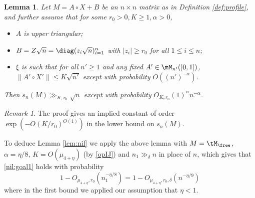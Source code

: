 \documentclass[aop,preprint]{imsart}
\theoremstyle{plain}
\newtheorem{lemma}[theorem]{Lemma}
\theoremstyle{definition}
\theoremstyle{remark}
\newtheorem{remark}[theorem]{Remark}
\numberwithin{equation}{section}
\numberwithin{theorem}{section}
\begin{document}
\begin{lemma}
Let $M= A\circ X + B$ be an $n\times n$ matrix as in Definition \ref{def:profile}, and further assume that for some $r_0>0, K\ge 1, \alpha>0$,
\begin{itemize}
\item $A$ is upper triangular;
\item $B=Z\sqrt{n} = \diag(z_i\sqrt{n})_{i=1}^n$ with $|z_i|\ge r_0$ for all $1\le i\le n$;
\item $\xi$ is such that for all $n'\ge 1$ and any fixed $A'\in \mM_{n'}([0,1])$, $\|A'\circ X'\|\le K\sqrt{n'}$  except with probability $O((n')^{-\alpha})$.
\end{itemize}
Then $s_n(M) \gg_{K,r_0}\sqrt{n}$ except with probability $O_{K,r_0}(1)^\alpha n^{-\alpha}$.
\end{lemma}

\begin{remark}
The proof gives an implied constant of order $\exp(-O(K/r_0)^{O(1)})$ in the lower bound on $s_n(M)$. 
\end{remark}

To deduce Lemma \ref{lem:nil} we apply the above lemma with $M=\tM_{\free}$, $\alpha=\eta/8$, $K=O(\mu_{4+\eta})$ (by \eqref{opIJ}) and $n_1\gg_{\delta}n$ in place of $n$, which gives that \eqref{nil:goal1} holds with probability 
\begin{equation}
1-O_{\mu_{4+\eta},r_0}(n_1^{-\eta/8}) = 1-O_{\mu_{4+\eta},r_0,\delta}(n^{-\eta/9})
\end{equation}
where in the first bound we applied our assumption that $\eta<1$. 
\end{document}
